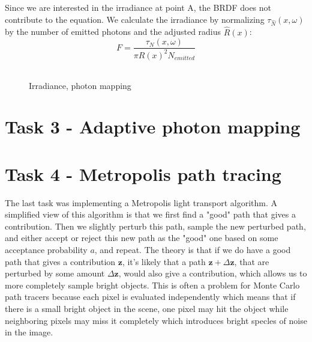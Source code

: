 \documentclass{article} %
\begin{document}
Since we are interested in the irradiance at point A, the BRDF does not contribute to the equation. We calculate the irradiance by normalizing $\tau_{\hat{N}}(x, \omega)$ by the number of emitted photons and the adjusted radius $\hat{R}(x)$:
$$F = \frac{\tau_{N}(x, \omega)}{\pi R(x)^2 N_{emitted}}$$

\begin{figure}[H]
\begin{tabular}{c}
\end{tabular}
\caption{Irradiance, photon mapping}
\label{fig:pm_irradiance}
\end{figure}


\section*{Task 3 - Adaptive photon mapping}

\section*{Task 4 - Metropolis path tracing}
The last task was implementing a Metropolis light transport algorithm. A simplified view of this algorithm is that we first find a "good" path that gives a contribution. Then we slightly perturb this path, sample the new perturbed path, and either accept or reject this new path as the "good" one based on some acceptance probability $a$, and repeat. The theory is that if we do have a good path that gives a contribution $\mathbf{z}$, it's likely that a path $\mathbf{z}+\Delta \mathbf{z}$, that are perturbed by some amount $\Delta \mathbf{z}$, would also give a contribution, which allows us to more completely sample bright objects. This is often a problem for Monte Carlo path tracers because each pixel is evaluated independently which means that if there is a small bright object in the scene, one pixel may hit the object while neighboring pixels may miss it completely which introduces bright specles of noise in the image. 
\end{document}
